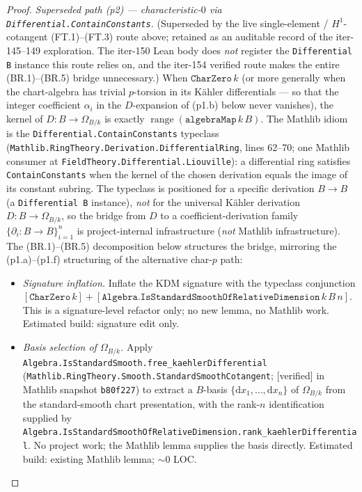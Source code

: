 \begin{proof}
  \emph{Superseded path (p2) --- characteristic-\(0\) via \texttt{Differential.ContainConstants}.} (Superseded by the live single-element / \(H^1\)-cotangent (FT.1)--(FT.3) route above; retained as an auditable record of the iter-145--149 exploration. The iter-150 Lean body does \emph{not} register the \texttt{Differential B} instance this route relies on, and the iter-154 verified route makes the entire (BR.1)--(BR.5) bridge unnecessary.) When \(\mathtt{CharZero}\,k\) (or more generally when the chart-algebra has trivial \(p\)-torsion in its K\"ahler differentials --- so that the integer coefficient \(\alpha_i\) in the \(D\)-expansion of (p1.b) below never vanishes), the kernel of \(D \colon B \to \Omega_{B/k}\) is exactly \(\operatorname{range}(\mathtt{algebraMap}\,k\,B)\). The Mathlib idiom is the \texttt{Differential.ContainConstants} typeclass (\texttt{Mathlib.RingTheory.Derivation.DifferentialRing}, lines 62--70; one Mathlib consumer at \texttt{FieldTheory.Differential.Liouville}): a differential ring satisfies \texttt{ContainConstants} when the kernel of the chosen derivation equals the image of its constant subring. The typeclass is positioned for a specific derivation \(B \to B\) (a \texttt{Differential B} instance), \emph{not} for the universal K\"ahler derivation \(D \colon B \to \Omega_{B/k}\), so the bridge from \(D\) to a coefficient-derivation family \(\{\partial_i \colon B \to B\}_{i = 1}^{n}\) is project-internal infrastructure (\emph{not} Mathlib infrastructure). The (BR.1)--(BR.5) decomposition below structures the bridge, mirroring the (p1.a)--(p1.f) structuring of the alternative char-\(p\) path:
  \begin{itemize}
    \item[(BR.1)] \emph{Signature inflation.} Inflate the KDM signature with the typeclass conjunction \([\mathtt{CharZero}\,k] + [\mathtt{Algebra.IsStandardSmoothOfRelativeDimension}\,k\,B\,n]\). This is a signature-level refactor only; no new lemma, no Mathlib work. Estimated build: signature edit only.
    \item[(BR.2)] \emph{Basis selection of \(\Omega_{B/k}\).} Apply \texttt{Algebra.IsStandardSmooth.free\_kaehlerDifferential} (\texttt{Mathlib.RingTheory.Smooth.StandardSmoothCotangent}; [verified] in Mathlib snapshot \texttt{b80f227}) to extract a \(B\)-basis \(\{\mathrm dx_1, \ldots, \mathrm dx_n\}\) of \(\Omega_{B/k}\) from the standard-smooth chart presentation, with the rank-\(n\) identification supplied by \texttt{Algebra.IsStandardSmoothOfRelativeDimension.rank\_kaehlerDifferential}. No project work; the Mathlib lemma supplies the basis directly. Estimated build: existing Mathlib lemma; \({\sim}0\) LOC.

\end{itemize}
\end{proof}
